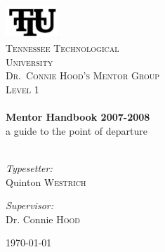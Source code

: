 \begin{titlepage}

\begin{center}


\includegraphics[width=0.15\textwidth]{TTULogo2.jpg}\\[1cm]

\textsc{\LARGE Tennessee Technological \\[2mm] University}\\[1.5cm]

\textsc{\Large Dr.\ Connie Hood's Mentor Group \\ Level 1}\\[0.5cm]

\HRule \\[0.4cm]
{ \huge \bfseries Mentor Handbook 2007-2008}\\[4mm]
{ \Large a guide to the point of departure}\\[2mm]

\HRule \\[1.5cm]

\begin{minipage}{0.4\textwidth}
\begin{flushleft} \large
\emph{Typesetter:}\\
Quinton \textsc{Westrich}
\end{flushleft}
\end{minipage}
\begin{minipage}{0.4\textwidth}
\begin{flushright} \large
\emph{Supervisor:} \\
Dr. Connie \textsc{Hood}
\end{flushright}
\end{minipage}

\vfill

{\large \today}

\end{center}



\end{titlepage}